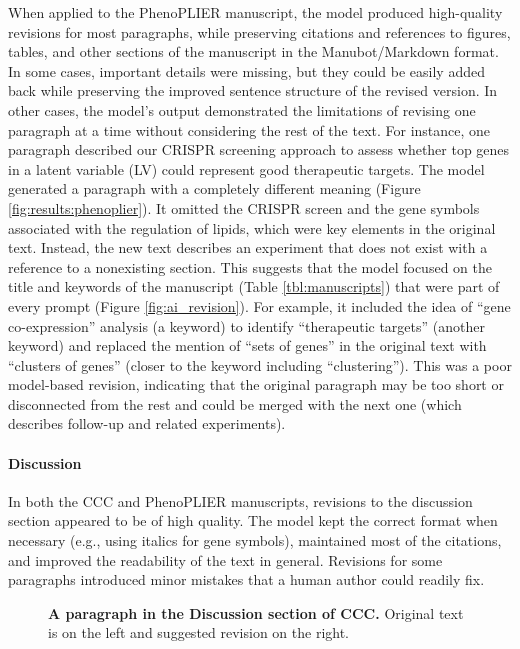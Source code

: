 \documentclass[
]{article}
\begin{document}
When applied to the PhenoPLIER manuscript, the model produced high-quality revisions for most paragraphs, while preserving citations and references to figures, tables, and other sections of the manuscript in the Manubot/Markdown format.
In some cases, important details were missing, but they could be easily added back while preserving the improved sentence structure of the revised version.
In other cases, the model's output demonstrated the limitations of revising one paragraph at a time without considering the rest of the text.
For instance, one paragraph described our CRISPR screening approach to assess whether top genes in a latent variable (LV) could represent good therapeutic targets.
The model generated a paragraph with a completely different meaning (Figure \ref{fig:results:phenoplier}).
It omitted the CRISPR screen and the gene symbols associated with the regulation of lipids, which were key elements in the original text.
Instead, the new text describes an experiment that does not exist with a reference to a nonexisting section.
This suggests that the model focused on the title and keywords of the manuscript (Table \ref{tbl:manuscripts}) that were part of every prompt (Figure \ref{fig:ai_revision}).
For example, it included the idea of ``gene co-expression'' analysis (a keyword) to identify ``therapeutic targets'' (another keyword) and replaced the mention of ``sets of genes'' in the original text with ``clusters of genes'' (closer to the keyword including ``clustering'').
This was a poor model-based revision, indicating that the original paragraph may be too short or disconnected from the rest and could be merged with the next one (which describes follow-up and related experiments).

\hypertarget{discussion}{%
\paragraph{Discussion}\label{discussion}}

In both the CCC and PhenoPLIER manuscripts, revisions to the discussion section appeared to be of high quality.
The model kept the correct format when necessary (e.g., using italics for gene symbols), maintained most of the citations, and improved the readability of the text in general.
Revisions for some paragraphs introduced minor mistakes that a human author could readily fix.

\begin{figure}
\hypertarget{fig:discussion:ccc}{%
\centering

\caption{\textbf{A paragraph in the Discussion section of CCC.}
Original text is on the left and suggested revision on the right.}\label{fig:discussion:ccc}
}
\end{figure}
\end{document}
